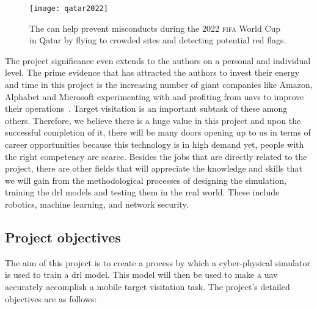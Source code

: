 \documentclass[../main.tex]{subfiles}
\begin{document}
\begin{figure}[tb] 
    \centering
    \texttt{[image: qatar2022]} 
    \caption{The \uav can help prevent misconducts during
    the 2022 \textsc{fifa} World Cup in Qatar by flying 
    to crowded sites and detecting potential red flags.} 
    \label{fig:fifa} 
\end{figure}

The project significance even extends to the authors
on a personal and individual level.
The prime evidence that has attracted the authors to invest
their energy and time in this project is
the increasing number of giant companies like Amazon, Alphabet
and Microsoft experimenting with and profiting from \glspl{uav}
to improve their operations~\cite{Jun17}.
Target visitation is an important subtask of these among others.
Therefore, we believe there is a huge value
in this project and upon the successful completion of it,
there will be many doors opening up to us in terms of
career opportunities because 
this technology is in high demand yet, 
people with the right competency
are scarce.
Besides the jobs that are directly related to the project,
there are other fields that will appreciate the knowledge
and skills that we will gain from the methodological processes 
of designing the simulation,
training the \gls{drl} models and testing them in the real world.
These include robotics, machine learning, and 
network security.


\subsection{Project objectives}\label{sec:objectives}

The aim of this project is to create a process 
by which a cyber-physical simulator is used to train 
a \gls{drl} model. This model will then be used
to make a \gls{uav} accurately accomplish a
mobile target visitation task.
The project's detailed objectives are as follows:
\end{document}
